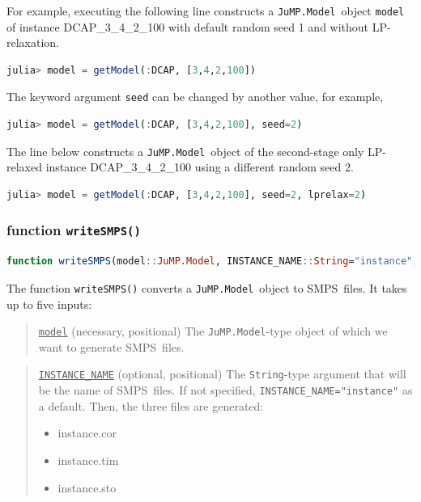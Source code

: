\documentclass{hitec}
\newcommand{\smps}{\textsf{SMPS}}
\newcommand{\jumpmodel}{\texttt{JuMP.Model}}
\begin{document}
	For example, executing the following line constructs a \jumpmodel\ object \texttt{model} of instance DCAP\_3\_4\_2\_100 with default random seed 1 and without LP-relaxation.
	\begin{lstlisting}[frame=single,language=julia]
	julia> model = getModel(:DCAP, [3,4,2,100])
	\end{lstlisting}
	The keyword argument \texttt{seed} can be changed by another value, for example,
	\begin{lstlisting}[frame=single,language=julia]
	julia> model = getModel(:DCAP, [3,4,2,100], seed=2)
	\end{lstlisting}
	The line below constructs a \jumpmodel\ object of the second-stage only LP-relaxed instance DCAP\_3\_4\_2\_100 using a different random seed 2.
	\begin{lstlisting}[frame=single,language=julia]
	julia> model = getModel(:DCAP, [3,4,2,100], seed=2, lprelax=2)
	\end{lstlisting}
	
	

	
	\subsubsection{function \texttt{writeSMPS()}}
	\begin{lstlisting}[frame=single,language=julia]
	function writeSMPS(model::JuMP.Model, INSTANCE_NAME::String="instance", DIR_NAME::String="$(dirname(@__FILE__))/../instance"; genericnames::Bool=true, splice::Bool=true)
	\end{lstlisting}
	The function \texttt{writeSMPS()} converts a \jumpmodel\ object to \smps\ files. It takes up to five inputs:
	
	\begin{quote}
		\noindent\underline{\texttt{model}} (necessary, positional) The \jumpmodel-type object of which we want to generate \smps\ files.
	\end{quote}
	
	\begin{quote}
		\noindent\underline{\texttt{INSTANCE\_NAME}} (optional, positional) The \texttt{String}-type argument that will be the name of \smps\ files. If not specified, \texttt{INSTANCE\_NAME="instance"} as a default. Then, the three files are generated:
		\begin{itemize}
			\item instance.cor
			\item instance.tim
			\item instance.sto
		\end{itemize}
	\end{quote}
	
\end{document}
